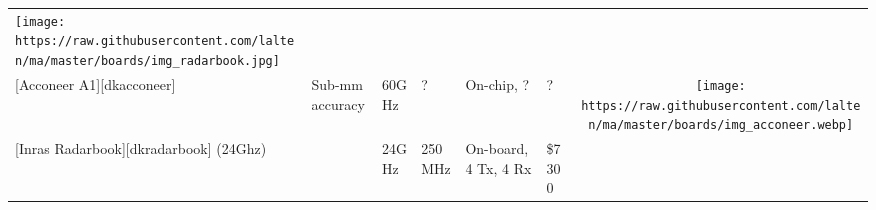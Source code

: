 \begin{longtable}[]{@{}llllllc@{}}
\begin{minipage}[t]{0.10\columnwidth}
\texttt{[image: https://raw.githubusercontent.com/lalten/ma/master/boards/img\_radarbook.jpg]}\strut
\end{minipage}\tabularnewline
\begin{minipage}[t]{0.09\columnwidth}\raggedright\strut
{[}Acconeer A1{]}{[}dkacconeer{]}\strut
\end{minipage} & \begin{minipage}[t]{0.13\columnwidth}\raggedright\strut
Sub-mm accuracy\strut
\end{minipage} & \begin{minipage}[t]{0.09\columnwidth}\raggedright\strut
60GHz\strut
\end{minipage} & \begin{minipage}[t]{0.11\columnwidth}\raggedright\strut
?\strut
\end{minipage} & \begin{minipage}[t]{0.10\columnwidth}\raggedright\strut
On-chip, ?\strut
\end{minipage} & \begin{minipage}[t]{0.15\columnwidth}\raggedright\strut
?\strut
\end{minipage} & \begin{minipage}[t]{0.10\columnwidth}\centering\strut
\texttt{[image: https://raw.githubusercontent.com/lalten/ma/master/boards/img\_acconeer.webp]}\strut
\end{minipage}\tabularnewline
\begin{minipage}[t]{0.09\columnwidth}\raggedright\strut
{[}Inras Radarbook{]}{[}dkradarbook{]} (24Ghz)\strut
\end{minipage} & \begin{minipage}[t]{0.13\columnwidth}\raggedright\strut
\strut
\end{minipage} & \begin{minipage}[t]{0.09\columnwidth}\raggedright\strut
24GHz\strut
\end{minipage} & \begin{minipage}[t]{0.11\columnwidth}\raggedright\strut
250MHz\strut
\end{minipage} & \begin{minipage}[t]{0.10\columnwidth}\raggedright\strut
On-board, 4 Tx, 4 Rx\strut
\end{minipage} & \begin{minipage}[t]{0.15\columnwidth}\raggedright\strut
\$7300\strut
\end{minipage} & \begin{minipage}[t]{0.10\columnwidth}\centering\strut

\end{minipage}
\end{longtable}
